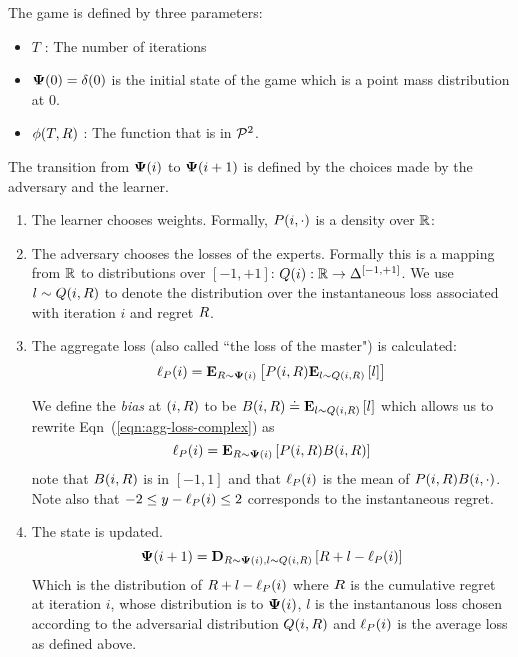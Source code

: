 \documentclass[12pt]{article} %
\begin{document}
The game is defined by three parameters:
\begin{itemize}
\item $T$ : The number of iterations
\item ${\bf \Psi}(0) = \delta(0)$ is the initial state of the game which
  is a point mass distribution at 0. 
\item $\phi(T,R)$ : The function that is in ${\cal P}^{2}$.
\end{itemize}

The transition from ${\bf \Psi}(i)$ to ${\bf \Psi}(i+1)$ is  defined by the
choices made by the adversary and the learner.

\begin{enumerate}
\item The learner chooses weights. Formally, $P(i,\cdot)$ is 
  a density over $\mathbb{R}$:
\item The adversary chooses the losses of the experts. Formally 
  this is a mapping from $\mathbb{R}$ to distributions
  over $[-1,+1]$: $Q(i): \mathbb{R} \to \Delta^{[-1,+1]}$. We use
  $l \sim Q(i,R)$ to denote the distribution over the
  instantaneous loss associated with iteration $i$ and regret $R$.
\item The aggregate loss (also called ``the loss of the master") is
  calculated:
  \begin{equation} \label{eqn:agg-loss-complex}
  \ell_P(i)={\bf E}_{R \sim {\bf \Psi}(i)}\left[ P(i,R) {\bf E}_{l \sim Q(i,R)}\left[ l \right] \right]
  \end{equation}
  
  We define the {\em bias} at $(i,R)$ to be  $B(i,R) \doteq {\bf E}_{l
    \sim Q(i,R)}\left[ l \right]$ which allows us to rewrite
  Eqn~(\ref{eqn:agg-loss-complex}) as
  \begin{equation} \label{eqn:aggregate-loss}
    \ell_P(i)={\bf E}_{R \sim {\bf \Psi}(i)}\left[ P(i,R) B(i,R) \right]
  \end{equation}
  note that $B(i,R)$ is in $[-1,1]$ and that $\ell_P(i)$ is the mean
  of $P(i,R) B(i,\cdot)$. Note also that $-2 \leq y-\ell_P(i) \leq 2$
  corresponds to the instantaneous regret.
  
\item The state is updated. 
  \begin{equation} \label{eqn:state-update}
    {\bf \Psi}(i+1) = {\bf D}_{R \sim {\bf \Psi}(i), l \sim Q(i,R)}\left[ R + l -\ell_P(i) \right]
  \end{equation}
  Which is the distribution of $R+l -\ell_P(i)$ where $R$ is the
  cumulative regret at iteration $i$, whose distribution is to
  ${\bf \Psi}(i)$, $l$ is the instantanous loss chosen according to the
  adversarial distribution $Q(i,R)$ and $\ell_P(i)$ is the
  average loss as defined above. 
\end{enumerate}
\end{document}

